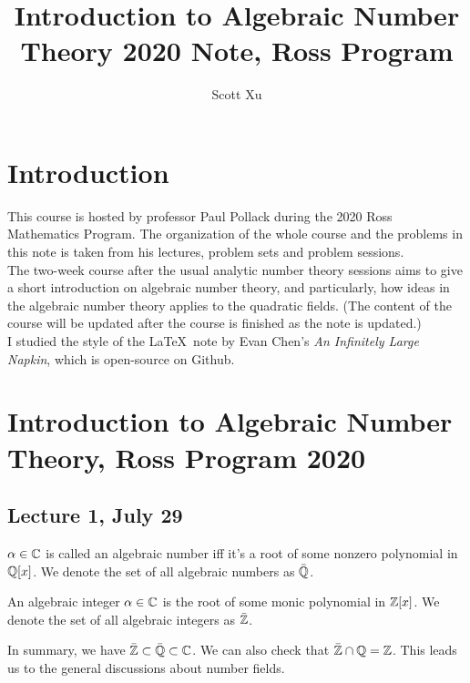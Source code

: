 \documentclass[12pt,twoside=semi,openright,numbers=noenddot]{scrbook}
\title{Introduction to Algebraic Number Theory 2020 Note, Ross Program}
\author{Scott Xu}
\date{}
\begin{document}
\maketitle
\tableofcontents
\setcounter{chapter}{-1}
\setlength{\parindent}{0pt}

\chapter{Introduction}
    This course is hosted by professor Paul Pollack during the 2020 Ross Mathematics Program. The organization of the whole course and 
    the problems in this note is taken from his lectures, problem sets and problem sessions. \\
    \newline
    The two-week course after the usual analytic number theory sessions aims to give a short introduction on algebraic number theory, 
    and particularly, how ideas in the algebraic number theory applies to the quadratic fields. (The content of the course will be updated 
    after the course is finished as the note is updated.) \\
    \newline
    I studied the style of the \LaTeX \ note by Evan Chen's \emph{An Infinitely Large Napkin}, which is open-source on Github.

\chapter{Introduction to Algebraic Number Theory, Ross Program 2020}
\section{Lecture 1, July 29}
\begin{definition}
    $\alpha \in \mathbb C$ is called an algebraic number iff it's a root of some nonzero polynomial in $\mathbb Q[x]$. We denote the set of all 
    algebraic numbers as $\bar{\mathbb Q}$.
\end{definition}
\begin{definition}
    An algebraic integer $\alpha \in \mathbb C$ is the root of some monic polynomial in $\mathbb Z[x]$.
    We denote the set of all algebraic integers as $\bar{\mathbb Z}$. 
\end{definition}
In summary, we have $\bar{\mathbb Z} \subset \bar{\mathbb Q} \subset \mathbb C$. We can also check that 
$\bar{\mathbb Z} \cap \mathbb Q = \mathbb Z$. This leads us to the general discussions about number fields.\\
\end{document}
